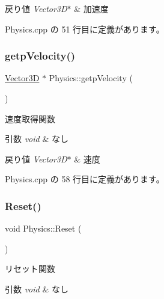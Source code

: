 \begin{DoxyRetVals}{戻り値}
{\em Vector3\+D$\ast$} & 加速度 \\
\hline
\end{DoxyRetVals}


 Physics.\+cpp の 51 行目に定義があります。

\mbox{\label{class_physics_a6025f297e751c71a3c54260007c175ee}} 
\subsubsection{\texorpdfstring{getp\+Velocity()}{getpVelocity()}}
{\footnotesize\ttfamily \mbox{\hyperlink{class_vector3_d}{Vector3D}} $\ast$ Physics\+::getp\+Velocity (\begin{DoxyParamCaption}{ }\end{DoxyParamCaption})}



速度取得関数 


\begin{DoxyParams}{引数}
{\em void} & なし \\
\hline
\end{DoxyParams}

\begin{DoxyRetVals}{戻り値}
{\em Vector3\+D$\ast$} & 速度 \\
\hline
\end{DoxyRetVals}


 Physics.\+cpp の 58 行目に定義があります。

\mbox{\label{class_physics_a7ba30ff9f5a0a0a12616ed861f68a20f}} 
\subsubsection{\texorpdfstring{Reset()}{Reset()}}
{\footnotesize\ttfamily void Physics\+::\+Reset (\begin{DoxyParamCaption}{ }\end{DoxyParamCaption})\hspace{0.3cm}{\ttfamily [private]}}



リセット関数 


\begin{DoxyParams}{引数}
{\em void} & なし \\
\hline
\end{DoxyParams}

